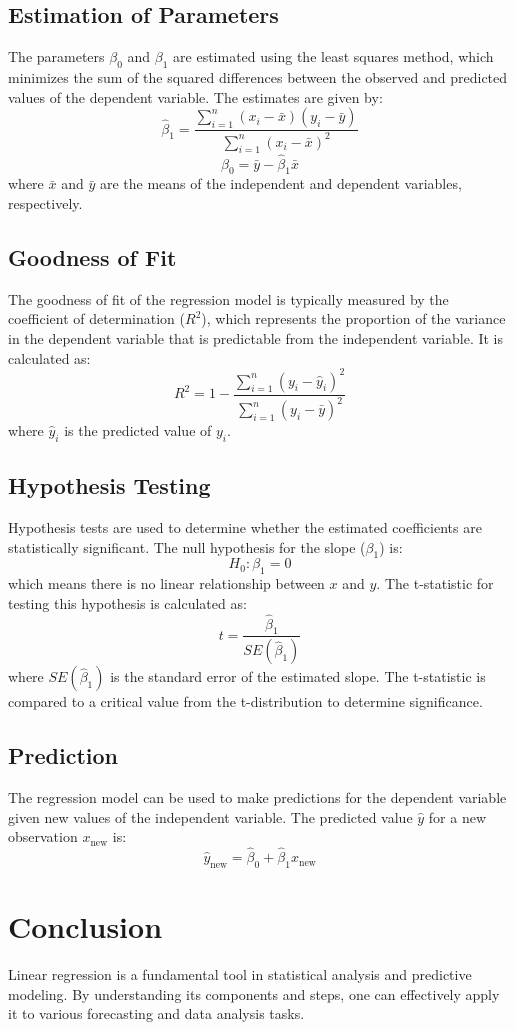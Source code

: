 \documentclass{article}
\begin{document}
\subsection{Estimation of Parameters}
The parameters \( \beta_0 \) and \( \beta_1 \) are estimated using the least squares method, which minimizes the sum of the squared differences between the observed and predicted values of the dependent variable. The estimates are given by:
\[
\hat{\beta}_1 = \frac{\sum_{i=1}^{n} (x_i - \bar{x})(y_i - \bar{y})}{\sum_{i=1}^{n} (x_i - \bar{x})^2}
\]
\[
\hat{\beta}_0 = \bar{y} - \hat{\beta}_1 \bar{x}
\]
where \( \bar{x} \) and \( \bar{y} \) are the means of the independent and dependent variables, respectively.

\subsection{Goodness of Fit}
The goodness of fit of the regression model is typically measured by the coefficient of determination (\( R^2 \)), which represents the proportion of the variance in the dependent variable that is predictable from the independent variable. It is calculated as:
\[
R^2 = 1 - \frac{\sum_{i=1}^{n} (y_i - \hat{y}_i)^2}{\sum_{i=1}^{n} (y_i - \bar{y})^2}
\]
where \( \hat{y}_i \) is the predicted value of \( y_i \).

\subsection{Hypothesis Testing}
Hypothesis tests are used to determine whether the estimated coefficients are statistically significant. The null hypothesis for the slope (\( \beta_1 \)) is:
\[
H_0: \beta_1 = 0
\]
which means there is no linear relationship between \( x \) and \( y \). The t-statistic for testing this hypothesis is calculated as:
\[
t = \frac{\hat{\beta}_1}{SE(\hat{\beta}_1)}
\]
where \( SE(\hat{\beta}_1) \) is the standard error of the estimated slope. The t-statistic is compared to a critical value from the t-distribution to determine significance.

\subsection{Prediction}
The regression model can be used to make predictions for the dependent variable given new values of the independent variable. The predicted value \( \hat{y} \) for a new observation \( x_{\text{new}} \) is:
\[
\hat{y}_{\text{new}} = \hat{\beta}_0 + \hat{\beta}_1 x_{\text{new}}
\]

\section{Conclusion}
Linear regression is a fundamental tool in statistical analysis and predictive modeling. By understanding its components and steps, one can effectively apply it to various forecasting and data analysis tasks.
\end{document}
